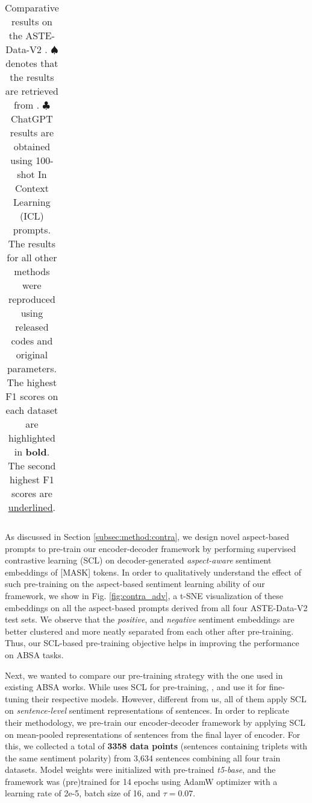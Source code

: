 \begin{table*}
{\begin{tabular}{l|c|c|c|c|c|c|c|c|c|c|c|c}
        \hline
        
    \end{tabular}
    }
    \caption{Comparative results on the ASTE-Data-V2 \cite{xu-etal-2020-position}. ${\spadesuit}$ denotes that the results are retrieved from \citet{xu-etal-2020-position}. ${\clubsuit}$ ChatGPT results are obtained using 100-shot In Context Learning (ICL) prompts. The results for all other methods were reproduced using released codes and original parameters. The highest F1 scores on each dataset are highlighted in \textbf{bold}. The second highest F1 scores are \underline{underlined}.}
    
    \label{tab:main_res}
\end{table*}


As discussed in Section \ref{subsec:method:contra}, we design novel aspect-based prompts to pre-train our encoder-decoder framework by performing supervised contrastive learning (SCL) on decoder-generated \textit{aspect-aware} sentiment embeddings of [MASK] tokens. 
In order to qualitatively understand the effect of such pre-training on the aspect-based sentiment learning ability of our framework, we show in Fig. \ref{fig:contra_adv}, a t-SNE \cite{tsne} visualization of these embeddings on all the aspect-based prompts derived from all four ASTE-Data-V2 test sets. 
We observe that the \textit{positive}, and 
\textit{negative} sentiment embeddings are better clustered and more neatly separated from each other after pre-training. 
Thus, our SCL-based pre-training objective helps in improving the performance on ABSA tasks.

Next, we wanted to compare our pre-training strategy with the one used in existing ABSA works. While \citet{li-etal-2021-learning-implicit} uses SCL for pre-training, \citet{contra-cikm21}, and \citet{ke-etal-2021-classic} use it for fine-tuning their respective models. 
However, different from us, all of them apply SCL on \textit{sentence-level} sentiment representations of sentences. 
In order to replicate their methodology, we pre-train our encoder-decoder framework by applying SCL on mean-pooled representations of sentences from the final layer of encoder.
For this, we collected a total of \textbf{3358 data points} (sentences containing triplets with the same sentiment polarity) from 3,634 sentences combining all four train datasets.
Model weights were initialized with pre-trained \textit{t5-base}, and the framework was (pre)trained for 14 epochs using AdamW optimizer with a learning rate of 2e-5, batch size of 16, and $\tau = 0.07$.

